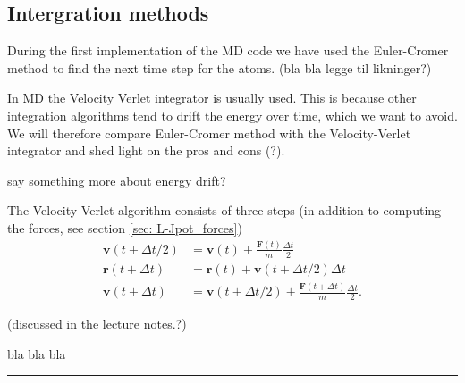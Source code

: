 \documentclass[11pt,a4wide]{article}
\renewcommand{\vec}{\mathbf}
\begin{document}
\subsection{Intergration methods}
During the first implementation of the MD code we have used the Euler-Cromer method to find the next time step for the atoms. (bla bla legge til likninger?)

In MD the Velocity Verlet integrator is usually used. This is because other integration algorithms tend to drift the energy over time, which we want to avoid. We will therefore compare Euler-Cromer method with the Velocity-Verlet integrator and shed light on the pros and cons (?).

say something more about energy drift?

The Velocity Verlet algorithm consists of three steps (in addition to computing the forces, see section \ref{sec: L-Jpot_forces})
\begin{align}
	\vec v(t + \Delta t/2) &= \vec v(t) + \frac{\vec F(t)}{m}\frac{\Delta t}{2}\\
	\vec r(t + \Delta t) &= \vec r(t) + \vec v(t + \Delta t/2)\Delta t\\
	\vec v(t + \Delta t) &= \vec v(t + \Delta t/2) + \frac{\vec F(t + \Delta t)}{m}\frac{\Delta t}{2}.
\end{align}


(discussed in the lecture notes.?)
  
  
bla bla bla  
  


\rule{0.3\textwidth}{0.4pt}\par %
\end{document}
